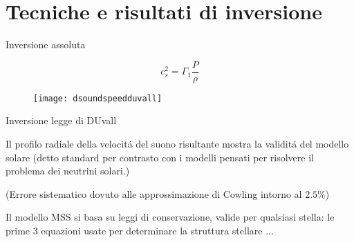 \documentclass[10pt,xcolor={usenames},fleqn,mathserif,serif]{beamer}
\begin{document}
\part{Tecniche e risultati di inversione}\label{part:inverseproblem}

\frame{\partpage}


\begin{frame}[]{Inversione assoluta}


\begin{equation*}
c_s^2=\Gamma_1\frac{P}{\rho}
\end{equation*}

\begin{figure}[!ht]
\texttt{[image: dsoundspeedduvall]} 

\label{dsoundduvall}
\end{figure}

\end{frame}

\begin{wordonframe}{Inversione legge di DUvall}

Il profilo radiale della velocit\'a del suono risultante  mostra la validit\'a del modello solare (detto standard per contrasto con i modelli pensati per risolvere il problema dei neutrini solari.)

(Errore sistematico dovuto alle approssimazione di Cowling intorno al $2.5\%$)

Il modello MSS si basa su leggi di conservazione, valide per qualsiasi stella: le prime 3 equazioni usate per determinare la struttura stellare ...

\end{wordonframe}

\end{document}
